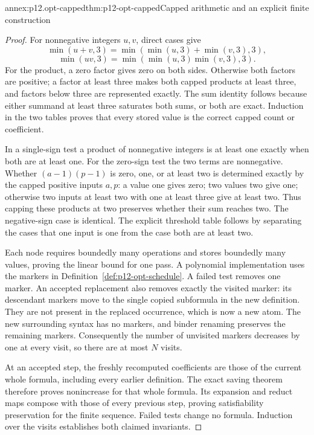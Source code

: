 \begin{annexitem}{annex:p12.opt-capped}{thm:p12-opt-capped}{Capped arithmetic and an explicit finite construction}
\begin{proof}
For nonnegative integers \(u,v\), direct cases give
\[
 \min(u+v,3)=\min(\min(u,3)+\min(v,3),3),
\]
\[
 \min(uv,3)=\min(\min(u,3)\min(v,3),3).
\]
For the product, a zero factor gives zero on both sides. Otherwise
both factors are positive; a factor at least three makes both
capped products at least three, and factors below three are
represented exactly. The sum identity follows because either
summand at least three saturates both sums, or both are exact.
Induction in the two tables proves that every stored value is the
correct capped count or coefficient.

In a single-sign test a product of nonnegative integers is at least
one exactly when both are at least one. For the zero-sign test the
two terms are nonnegative. Whether \((a-1)(p-1)\) is zero, one,
or at least two is determined exactly by the capped positive
inputs \(a,p\): a value one gives zero; two values two give one;
otherwise two inputs at least two with one at least three give
at least two. Thus capping these products at two preserves whether
their sum reaches two. The negative-sign case is identical.
The explicit threshold table follows by separating the cases that
one input is one from the case both are at least two.

Each node requires boundedly many operations and stores boundedly
many values, proving the linear bound for one pass.
A polynomial implementation uses the markers in
Definition~\ref{def:p12-opt-schedule}. A failed test removes one marker.
An accepted replacement also removes exactly the visited marker:
its descendant markers move to the single copied subformula in the
new definition. They are not present in the replaced occurrence,
which is now a new atom. The new surrounding syntax has no markers,
and binder renaming preserves the remaining markers. Consequently
the number of unvisited markers decreases by one at every visit,
so there are at most \(N\) visits.

At an accepted step, the freshly recomputed coefficients are those
of the current whole formula, including every earlier definition.
The exact saving theorem therefore proves nonincrease for that
whole formula. Its expansion and reduct maps compose with those
of every previous step, proving satisfiability preservation for
the finite sequence. Failed tests change no formula. Induction
over the visits establishes both claimed invariants.


\end{proof}
\end{annexitem}
